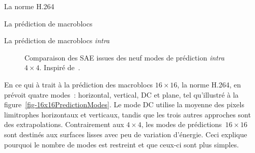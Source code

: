 \documentclass[letterpaper, twoside, 12pt,memoire]{thETS}
\begin{document}
\begin{chapter}{La norme H.264}
\begin{section}{La prédiction de macroblocs}
\begin{subsection}{La prédiction de macroblocs \textit{intra}}
\begin{figure}[htb]
\caption{Comparaison des SAE issues des neuf modes de prédiction
\textit{intra} $4 \times 4$. Inspiré de~\cite{richardson2003}.}
\label{fig-SAEPredictionBlocks}
\end{figure}

En ce qui à trait à la prédiction des macroblocs $16\times16$, la norme H.264,
en prévoit quatre modes~: horizontal, vertical, DC et plane, tel qu'illustré à
la figure~\ref{fig-16x16PredictionModes}. Le mode DC utilise la moyenne des
pixels limitrophes horizontaux et verticaux, tandis que les trois autres
approches sont des extrapolations. Contrairement aux $4 \times 4$, les modes de
prédictions~$16 \times 16$ sont destinés aux surfaces lisses avec peu de
variation d'énergie. Ceci explique pourquoi le nombre de modes est restreint et
que ceux-ci sont plus simples.


\end{subsection}
\end{section}
\end{chapter}
\end{document}

